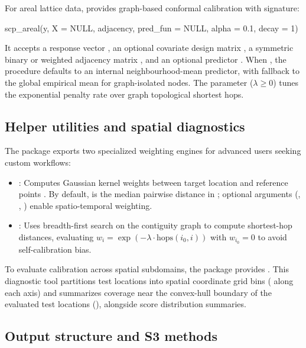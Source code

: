 \documentclass[article]{jss}
\begin{document}
For areal lattice data,  provides graph-based conformal calibration with signature:
%
\begin{Code}
scp_areal(y, X = NULL, adjacency, pred_fun = NULL,
          alpha = 0.1, decay = 1)
\end{Code}
%
It accepts a response vector , an optional covariate design matrix , a symmetric binary or weighted adjacency matrix , and an optional predictor . When , the procedure defaults to an internal neighbourhood-mean predictor, with fallback to the global empirical mean for graph-isolated nodes. The parameter  ($\lambda \ge 0$) tunes the exponential penalty rate over graph topological shortest hops.

\subsection{Helper utilities and spatial diagnostics}

The package exports two specialized weighting engines for advanced users seeking custom workflows:
\begin{itemize}
\item {}: Computes Gaussian kernel weights between target location  and reference points . By default,  is the median pairwise distance in ; optional arguments (, , ) enable spatio-temporal weighting.
\item {}: Uses breadth-first search on the contiguity graph to compute shortest-hop distances, evaluating $w_i = \exp(-\lambda \cdot \mathrm{hops}(i_0, i))$ with $w_{i_0} = 0$ to avoid self-calibration bias.
\end{itemize}

To evaluate calibration across spatial subdomains, the package provides . This diagnostic tool partitions test locations into spatial coordinate grid bins ( along each axis) and summarizes coverage near the convex-hull boundary of the evaluated test locations (), alongside score distribution summaries.

\subsection{Output structure and S3 methods}
\end{document}

